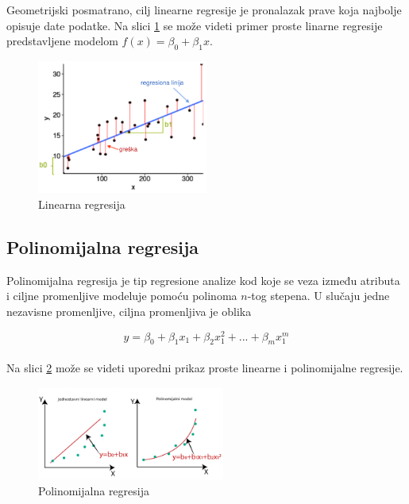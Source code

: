 \documentclass[main.tex]{subfiles}
\begin{document}
Geometrijski posmatrano, cilj linearne regresije je pronalazak prave koja najbolje opisuje date podatke. Na slici \ref{fig:linReg} se može videti primer proste linarne regresije predstavljene modelom $f(x) = \beta_0 + \beta_1 x$.


\begin{figure}[!ht]
\begin{center}
\includegraphics[width=0.5\textwidth]{../images_pdf/linear_regression.pdf}
\end{center}
\caption{Linearna regresija}
\label{fig:linReg}
\end{figure}


%



\subsection{Polinomijalna regresija}
\label{sec:polinomijalnaRegresija}

Polinomijalna regresija je tip regresione analize kod koje se veza između atributa i ciljne promenljive modeluje pomoću polinoma $n$-tog stepena. U slučaju jedne nezavisne promenljive, ciljna promenljiva je oblika

\[ y = \beta_0 + \beta_1 x_1 + \beta_2 x_1^{2} + ... + \beta_m x_1^{m} \] \\

Na slici \ref{fig:polyReg} može se videti uporedni prikaz proste linearne i polinomijalne regresije.

\begin{figure}[!ht]
\begin{center}
\includegraphics[width=0.55\textwidth]{../images/polynomial_regression.jpg}
\end{center}
\caption{Polinomijalna regresija}
\label{fig:polyReg}
\end{figure}
\end{document}
